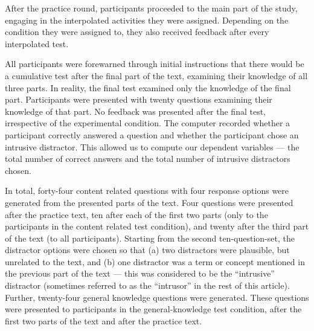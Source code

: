 \documentclass[11pt,]{article}
\begin{document}
After the practice round, participants proceeded to the main part of the
study, engaging in the interpolated activities they were assigned.
Depending on the condition they were assigned to, they also received
feedback after every interpolated test.

All participants were forewarned through initial instructions that there
would be a cumulative test after the final part of the text, examining
their knowledge of all three parts. In reality, the final test examined
only the knowledge of the final part. Participants were presented with
twenty questions examining their knowledge of that part. No feedback was
presented after the final test, irrespective of the experimental
condition. The computer recorded whether a participant correctly
answered a question and whether the participant chose an intrusive
distractor. This allowed us to compute our dependent variables --- the
total number of correct answers and the total number of intrusive
distractors chosen.

In total, forty-four content related questions with four response
options were generated from the presented parts of the text. Four
questions were presented after the practice text, ten after each of the
first two parts (only to the participants in the content related test
condition), and twenty after the third part of the text (to all
participants). Starting from the second ten-question-set, the distractor
options were chosen so that (a) two distractors were plausible, but
unrelated to the text, and (b) one distractor was a term or concept
mentioned in the previous part of the text --- this was considered to be
the ``intrusive'' distractor (sometimes referred to as the ``intrusor''
in the rest of this article). Further, twenty-four general knowledge
questions were generated. These questions were presented to participants
in the general-knowledge test condition, after the first two parts of
the text and after the practice text.
\end{document}
